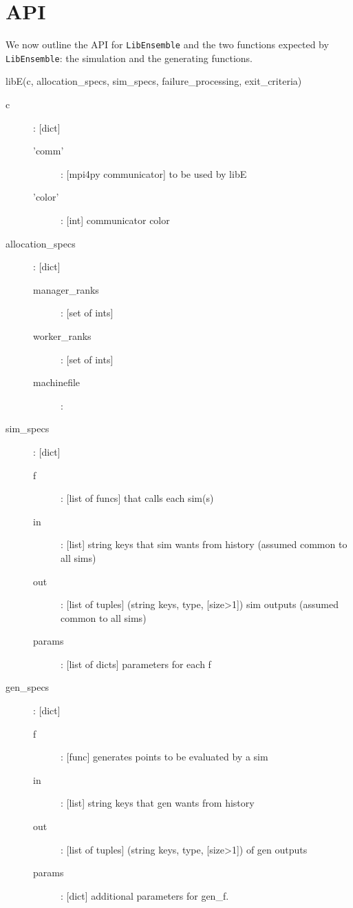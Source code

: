 \documentclass{article}
\newenvironment{allintypewriter}{\ttfamily}{\par}
\newcommand{\libE}{\texttt{LibEnsemble}\xspace}
\begin{document}
\section{API}
We now outline the API for \libE and the two functions expected by \libE: the
simulation and the generating functions.

\begin{allintypewriter}
  libE(c, allocation\_specs, sim\_specs, failure\_processing, exit\_criteria)\\

  \begin{description}
    \item[c]: [dict] 
      \begin{description}
        \item['comm']: [mpi4py communicator] to be used by libE
        \item['color']: [int] communicator color
      \end{description}

    \item[allocation\_specs]: [dict]
      \begin{description}
        \item[manager\_ranks]: [set of ints] 
        \item[worker\_ranks]: [set of ints]
        \item[machinefile]:
      \end{description}

    \item[sim\_specs]: [dict] 
      \begin{description}
        \item[f]: [list of funcs] that calls each sim(s)
        \item[in]: [list] string keys that sim wants from history (assumed common to all sims)
        \item[out]: [list of tuples] (string keys, type, [size>1]) sim outputs (assumed common to all sims)
        \item[params]: [list of dicts] parameters for each f
      \end{description}

    \item[gen\_specs]: [dict] 
      \begin{description}
        \item[f]: [func] generates points to be evaluated by a sim
        \item[in]: [list] string keys that gen wants from history
        \item[out]: [list of tuples] (string keys, type, [size>1]) of gen outputs
        \item[params]: [dict] additional parameters for gen\_f. 
      \end{description}


\end{description}
\end{allintypewriter}
\end{document}

